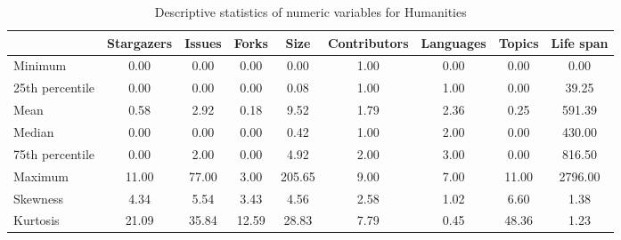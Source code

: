 \begin{table}
\centering
\caption{Descriptive statistics of numeric variables for Humanities}
\label{tab:Humanities}
\begin{tabular}{lcccccccc}
\toprule
{} &  Stargazers &  Issues &  Forks &    Size &  Contributors &  Languages &  Topics &  Life span \\
\midrule
Minimum         &        0.00 &    0.00 &   0.00 &    0.00 &          1.00 &       0.00 &    0.00 &       0.00 \\
25th percentile &        0.00 &    0.00 &   0.00 &    0.08 &          1.00 &       1.00 &    0.00 &      39.25 \\
Mean            &        0.58 &    2.92 &   0.18 &    9.52 &          1.79 &       2.36 &    0.25 &     591.39 \\
Median          &        0.00 &    0.00 &   0.00 &    0.42 &          1.00 &       2.00 &    0.00 &     430.00 \\
75th percentile &        0.00 &    2.00 &   0.00 &    4.92 &          2.00 &       3.00 &    0.00 &     816.50 \\
Maximum         &       11.00 &   77.00 &   3.00 &  205.65 &          9.00 &       7.00 &   11.00 &    2796.00 \\
Skewness        &        4.34 &    5.54 &   3.43 &    4.56 &          2.58 &       1.02 &    6.60 &       1.38 \\
Kurtosis        &       21.09 &   35.84 &  12.59 &   28.83 &          7.79 &       0.45 &   48.36 &       1.23 \\
\bottomrule
\end{tabular}
\end{table}
